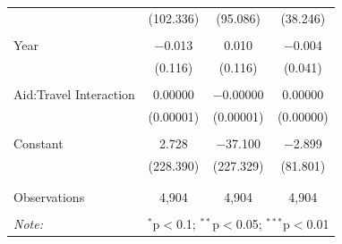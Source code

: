 \documentclass[12pt, letterpaper]{article}
\begin{document}
\begin{table}[!htbp]
\begin{tabular}{@{\extracolsep{5pt}}lccc}
		& (102.336) & (95.086) & (38.246) \\ 
		& & & \\ 
		Year & $-$0.013 & 0.010 & $-$0.004 \\ 
		& (0.116) & (0.116) & (0.041) \\ 
		& & & \\ 
		Aid:Travel Interaction & 0.00000 & $-$0.00000 & 0.00000 \\ 
		& (0.00001) & (0.00001) & (0.00000) \\ 
		& & & \\ 
		Constant & 2.728 & $-$37.100 & $-$2.899 \\ 
		& (228.390) & (227.329) & (81.801) \\ 
		& & & \\ 
		\hline \\[-1.8ex] 
		Observations & 4,904 & 4,904 & 4,904 \\ 
		\hline 
		\hline \\[-1.8ex] 
		\textit{Note:}  & \multicolumn{3}{r}{$^{*}$p$<$0.1; $^{**}$p$<$0.05; $^{***}$p$<$0.01} \\  
	\end{tabular} 
	\label{weighted2000}
\end{table}
\end{document}
